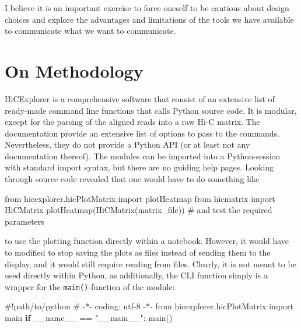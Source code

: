 \documentclass[
  11pt,
  a4paper,
]{scrbook}
\newenvironment{Shaded}{\begin{snugshade}}{\end{snugshade}}
\newcommand{\CommentTok}[1]{\textcolor[rgb]{0.54,0.53,0.53}{#1}}
\newcommand{\ControlFlowTok}[1]{\textcolor[rgb]{0.12,0.11,0.11}{\textbf{#1}}}
\newcommand{\ImportTok}[1]{\textcolor[rgb]{1.00,0.33,0.00}{#1}}
\newcommand{\NormalTok}[1]{\textcolor[rgb]{0.12,0.11,0.11}{#1}}
\newcommand{\OperatorTok}[1]{\textcolor[rgb]{0.12,0.11,0.11}{#1}}
\newcommand{\StringTok}[1]{\textcolor[rgb]{0.75,0.01,0.01}{#1}}
\newcommand{\VariableTok}[1]{\textcolor[rgb]{0.00,0.34,0.68}{#1}}
\renewenvironment{Shaded}
{
  \vspace{-0.5em} %
  \begin{snugshade} %
  \small %
}
{
  \end{snugshade} %
  \vspace{-1em} %
}
\begin{document}
I believe it is an important exercise to force oneself to be cautious
about design choices and explore the advantages and limitations of the
tools we have available to communicate what we want to communicate.

\section{On Methodology}\label{on-methodology}

HiCExplorer is a comprehensive software that consist of an extensive
list of ready-made command line functions that calls Python source code.
It is modular, except for the parsing of the aligned reads into a raw
Hi-C matrix. The documentation provide an extensive list of options to
pass to the commands. Nevertheless, they do not provide a Python API (or
at least not any documentation thereof). The modules can be imported
into a Python-session with standard import syntax, but there are no
guiding help pages. Looking through source code revealed that one would
have to do something like

\begin{Shaded}
\begin{Highlighting}[numbers=left,,]
\ImportTok{from}\NormalTok{ hicexplorer.hicPlotMatrix }\ImportTok{import}\NormalTok{ plotHeatmap}
\ImportTok{from}\NormalTok{ hicmatrix }\ImportTok{import}\NormalTok{ HiCMatrix}
\NormalTok{plotHeatmap(HiCMatrix(matrix\_file)) }\CommentTok{\# and test the required parameters}
\end{Highlighting}
\end{Shaded}

to use the plotting function directly within a notebook. However, it
would have to modified to stop saving the plots as files instead of
sending them to the display, and it would still require reading from
files. Clearly, it is not meant to be used directly within Python, as
additionally, the CLI function simply is a wrapper for the
\texttt{main()}-function of the module:

\begin{Shaded}
\begin{Highlighting}[numbers=left,,]
\CommentTok{\#!path/to/python}
\CommentTok{\# {-}*{-} coding: utf{-}8 {-}*{-}}
\ImportTok{from}\NormalTok{ hicexplorer.hicPlotMatrix }\ImportTok{import}\NormalTok{ main}
\ControlFlowTok{if} \VariableTok{\_\_name\_\_} \OperatorTok{==} \StringTok{"\_\_main\_\_"}\NormalTok{:}
\NormalTok{    main()}
\end{Highlighting}
\end{Shaded}
\end{document}
